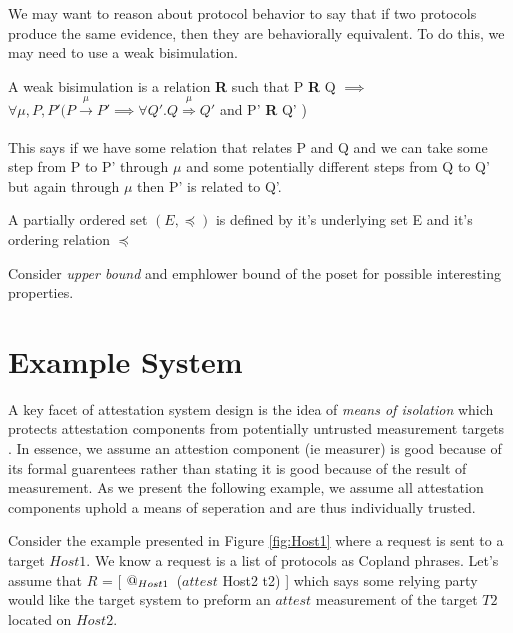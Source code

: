 \documentclass[12pt, letterpaper]{article}
\begin{document}
We may want to reason about protocol behavior to say that if two protocols produce the same evidence, then they are behaviorally equivalent. To do this, we may need to use a weak bisimulation. 

\begin{defn}
A weak bisimulation is a relation \textbf{R} such that P \textbf{R} Q $\implies$ $\forall \mu, P, P' (P \xrightarrow[]{\mu} P' \implies \forall Q'. Q \overset{\mu}\Rightarrow Q'$ and P' \textbf{R} Q' ) \cite{Milner} 
\end{defn}

This says if we have some relation that relates P and Q and we can take some step from P to P' through $\mu$ and some potentially different steps from Q to Q' but again through $\mu$ then P' is related to Q'.  

\begin{defn}
  A partially ordered set $(E, \preceq)$ is defined by it's underlying set E and it's ordering relation $\preceq$
\end{defn}

Consider \emph{upper bound} and emph{lower bound} of the poset for possible interesting properties. 


\section{Example System}

A key facet of attestation system design is the idea of \emph{means of isolation} which protects attestation components from potentially untrusted measurement targets \cite{Petz::DesignandFormal::2021}. In essence, we assume an attestion component (ie measurer) is good because of its formal guarentees rather than stating it is good because of the result of measurement. As we present the following example, we assume all attestation components uphold a means of seperation and are thus individually trusted. 

Consider the example presented in Figure \ref{fig:Host1} where a request is sent to a target $Host1$. We know a request is a list of protocols as Copland phrases. Let's assume that $R$ = [ $\mathop{@_{Host1}}{} $ ($attest$ Host2 t2) ] which says some relying party would like the target system to preform an $attest$ measurement of the target $T2$ located on $Host2$. 
\end{document}
